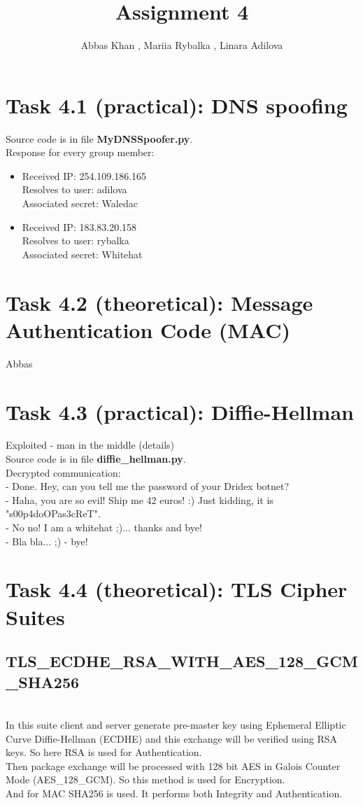\documentclass{article}
\title{Assignment 4}
\author{Abbas Khan , Mariia Rybalka , Linara Adilova}
\begin{document}
\maketitle 
    
\section*{Task 4.1 (practical): DNS spoofing}
Source code is in file \textbf{MyDNSSpoofer.py}.
\\
Response for every group member:
\begin{itemize}
\item
Received IP: 254.109.186.165
\\Resolves to user: adilova
\\Associated secret: Waledac
\item 
Received IP: 183.83.20.158
\\Resolves to user: rybalka
\\Associated secret: Whitehat
\end{itemize}


\section*{Task 4.2 (theoretical): Message Authentication Code (MAC)}
Abbas

\section*{Task 4.3 (practical): Diffie-Hellman}
Exploited - man in the middle (details)
\\
Source code is in file \textbf{diffie\_hellman.py}.
\\
Decrypted communication:
\\- Done. Hey, can you tell me the password of your Dridex botnet?
\\- Haha, you are so evil! Ship me 42 euros! :) Just kidding, it is "s00p4doOPas3cReT".
\\- No no! I am a whitehat ;)... thanks and bye!
\\- Bla bla... ;) - bye!

\section*{Task 4.4 (theoretical): TLS Cipher Suites}
\subsection*{TLS\_ECDHE\_RSA\_WITH\_AES\_128\_GCM\_SHA256}
\cite{tls-ref}
\\
In this suite client and server generate pre-master key using Ephemeral Elliptic Curve Diffie-Hellman (ECDHE) and this exchange will be verified using RSA keys. So here RSA is used for Authentication. 
\\
Then package exchange will be processed with 128 bit AES in Galois Counter Mode (AES\_128\_GCM). So this method is used for Encryption.
\\
And for MAC SHA256 is used. It performs both Integrity and Authentication.
\end{document}
